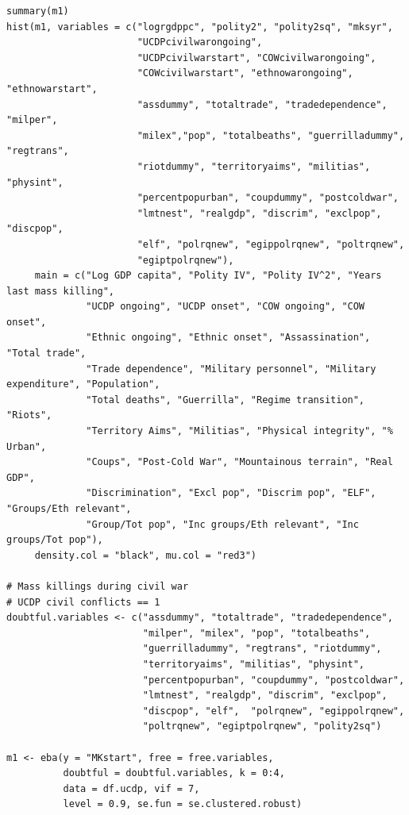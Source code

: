 \documentclass[a4paper,12pt]{article}
\begin{document}
\begin{verbatim}
summary(m1)
hist(m1, variables = c("logrgdppc", "polity2", "polity2sq", "mksyr",
                       "UCDPcivilwarongoing",
                       "UCDPcivilwarstart", "COWcivilwarongoing",
                       "COWcivilwarstart", "ethnowarongoing", "ethnowarstart",
                       "assdummy", "totaltrade", "tradedependence", "milper",
                       "milex","pop", "totalbeaths", "guerrilladummy", "regtrans",
                       "riotdummy", "territoryaims", "militias", "physint",
                       "percentpopurban", "coupdummy", "postcoldwar",
                       "lmtnest", "realgdp", "discrim", "exclpop", "discpop",
                       "elf", "polrqnew", "egippolrqnew", "poltrqnew",
                       "egiptpolrqnew"),
     main = c("Log GDP capita", "Polity IV", "Polity IV^2", "Years last mass killing",
              "UCDP ongoing", "UCDP onset", "COW ongoing", "COW onset", 
              "Ethnic ongoing", "Ethnic onset", "Assassination", "Total trade", 
              "Trade dependence", "Military personnel", "Military expenditure", "Population", 
              "Total deaths", "Guerrilla", "Regime transition", "Riots",
              "Territory Aims", "Militias", "Physical integrity", "% Urban",
              "Coups", "Post-Cold War", "Mountainous terrain", "Real GDP",
              "Discrimination", "Excl pop", "Discrim pop", "ELF", "Groups/Eth relevant", 
              "Group/Tot pop", "Inc groups/Eth relevant", "Inc groups/Tot pop"),
     density.col = "black", mu.col = "red3")
          
# Mass killings during civil war
# UCDP civil conflicts == 1
doubtful.variables <- c("assdummy", "totaltrade", "tradedependence",
                        "milper", "milex", "pop", "totalbeaths",
                        "guerrilladummy", "regtrans", "riotdummy",
                        "territoryaims", "militias", "physint",
                        "percentpopurban", "coupdummy", "postcoldwar",
                        "lmtnest", "realgdp", "discrim", "exclpop",
                        "discpop", "elf",  "polrqnew", "egippolrqnew",
                        "poltrqnew", "egiptpolrqnew", "polity2sq")

m1 <- eba(y = "MKstart", free = free.variables,
          doubtful = doubtful.variables, k = 0:4,
          data = df.ucdp, vif = 7,
          level = 0.9, se.fun = se.clustered.robust)
          

\end{verbatim}
\end{document}
